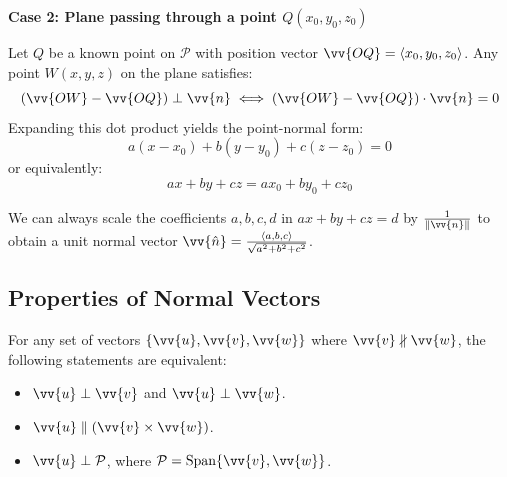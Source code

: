 \vspace{0.5em}
\noindent
\begin{minipage}[c]{0.52\textwidth}
\textbf{Case 2: Plane passing through a point $Q(x_0, y_0, z_0)$}

Let $Q$ be a known point on $\mathcal{P}$ with position vector $\vv{OQ} = \ang{x_0, y_0, z_0}$. Any point $W(x, y, z)$ on the plane satisfies:
\[
(\vv{OW} - \vv{OQ}) \perp \vv{n} \iff (\vv{OW} - \vv{OQ}) \cdot \vv{n} = 0
\]
Expanding this dot product yields the point-normal form:
\[
a(x - x_0) + b(y - y_0) + c(z - z_0) = 0
\]
or equivalently:
\[
ax + by + cz = ax_0 + by_0 + cz_0
\]
\end{minipage}%
\hfill
\begin{minipage}[c]{0.44\textwidth}
\centering
{}
\end{minipage}

\vspace{0.5em}

We can always scale the coefficients $a, b, c, d$ in $ax + by + cz = d$ by $\frac{1}{\|\vv{n}\|}$ to obtain a unit normal vector $\vv{\hat{n}} = \frac{\ang{a, b, c}}{\sqrt{a^2 + b^2 + c^2}}$.

\subsection{Properties of Normal Vectors}

For any set of vectors $\{\vv{u}, \vv{v}, \vv{w}\}$ where $\vv{v} \nparallel \vv{w}$, the following statements are equivalent:
\begin{itemize}
    \item $\vv{u} \perp \vv{v}$ and $\vv{u} \perp \vv{w}$.
    \item $\vv{u} \parallel (\vv{v} \times \vv{w})$.
    \item $\vv{u} \perp \mathcal{P}$, where $\mathcal{P} = \text{Span}\{\vv{v}, \vv{w}\}$.
\end{itemize}


